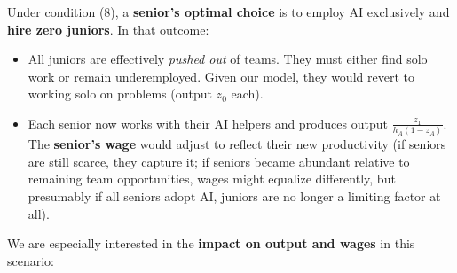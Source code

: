 \documentclass[12pt]{article}
\begin{document}
Under condition (8), a \textbf{senior's optimal choice} is to employ AI
exclusively and \textbf{hire zero juniors}. In that outcome:

\begin{itemize}
\tightlist
\item
  All juniors are effectively \emph{pushed out} of teams. They must
  either find solo work or remain underemployed. Given our model, they
  would revert to working solo on problems (output \(z_0\) each).
\item
  Each senior now works with their AI helpers and produces output
  \(\frac{z_1}{h_A(1-z_A)}\). The \textbf{senior's wage} would adjust to
  reflect their new productivity (if seniors are still scarce, they
  capture it; if seniors became abundant relative to remaining team
  opportunities, wages might equalize differently, but presumably if all
  seniors adopt AI, juniors are no longer a limiting factor at all).
\end{itemize}

We are especially interested in the \textbf{impact on output and wages}
in this scenario:
\end{document}
